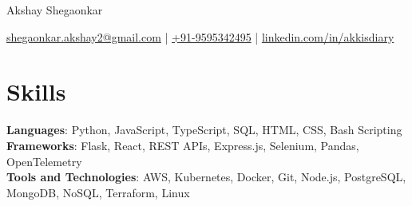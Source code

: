 \documentclass[11pt]{article}       %
\begin{document}
\centerline{\Huge Akshay Shegaonkar}

\vspace{5pt}

\centerline{\href{mailto:shegaonkar.akshay2@gmail.com}{shegaonkar.akshay2@gmail.com} | \href{tel:+919595342495}{+91-9595342495} | \href{https://www.linkedin.com/in/akkisdiary}{linkedin.com/in/akkisdiary}}

\vspace{-10pt}

\section*{Skills}
\textbf{Languages}: Python, JavaScript, TypeScript, SQL, HTML, CSS, Bash Scripting \\
\textbf{Frameworks}: Flask, React, REST APIs, Express.js, Selenium, Pandas, OpenTelemetry \\
\textbf{Tools and Technologies}: AWS, Kubernetes, Docker, Git, Node.js, PostgreSQL, MongoDB, NoSQL, Terraform, Linux \\
\vspace{-6.5pt}

\end{document}
